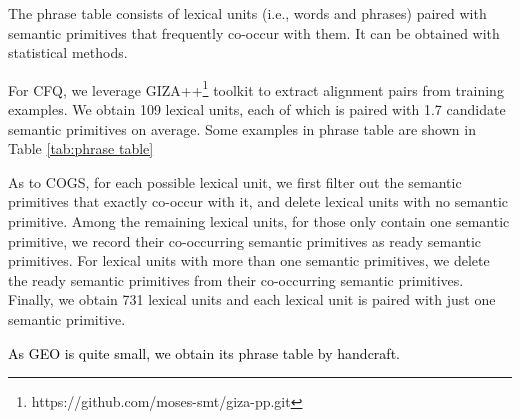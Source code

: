\documentclass[11pt,a4paper]{article}
\newcommand{\An}[1]{\textcolor{black}{#1}}
\begin{document}
\begin{table*}[t]
    \renewcommand\arraystretch{1.2}
    \centering
    \caption{Some examples in CFQ phrase table.}
    \label{tab:phrase table}
\end{table*}

The phrase table consists of lexical units (i.e., words and phrases) paired with semantic primitives that frequently co-occur with them.
It can be obtained with statistical methods.

For CFQ, we leverage GIZA++\footnote{https://github.com/moses-smt/giza-pp.git} \cite{och2003systematic-apd} toolkit to extract alignment pairs from training examples.
We obtain 109 lexical units, each of which is paired with 1.7 candidate semantic primitives on average.
Some examples in phrase table are shown in Table \ref{tab:phrase table}

As to COGS, for each possible lexical unit, we first filter out the semantic primitives that exactly co-occur with it, and delete lexical units with no semantic primitive.
Among the remaining lexical units, for those only contain one semantic primitive, we record their co-occurring semantic primitives as ready semantic primitives.
For lexical units with more than one semantic primitives, we delete the ready semantic primitives from their co-occurring semantic primitives.
Finally, we obtain 731 lexical units and each lexical unit is paired with just one semantic primitive.

\An{As GEO is quite small, we obtain its phrase table by handcraft.}
\end{document}
